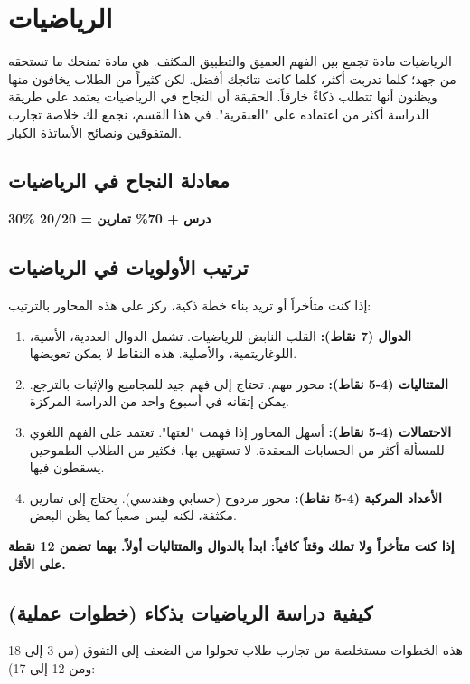 \documentclass[12pt,a4paper]{book}
\newcommand{\importantAr}[1]{%
	\begin{important}
		\bfseries #1
	\end{important}
}
\begin{document}
	\section{الرياضيات}
	
	الرياضيات مادة تجمع بين الفهم العميق والتطبيق المكثف. هي مادة تمنحك ما تستحقه من جهد؛ كلما تدربت أكثر، كلما كانت نتائجك أفضل. لكن كثيراً من الطلاب يخافون منها ويظنون أنها تتطلب ذكاءً خارقاً. الحقيقة أن النجاح في الرياضيات يعتمد على طريقة الدراسة أكثر من اعتماده على "العبقرية". في هذا القسم، نجمع لك خلاصة تجارب المتفوقين ونصائح الأساتذة الكبار.
	
	\subsection{معادلة النجاح في الرياضيات}
	\begin{center}
		\Large
		\textbf{30\% درس + 70\% تمارين = 20/20}
	\end{center}
	
	\subsection{ترتيب الأولويات في الرياضيات}
	إذا كنت متأخراً أو تريد بناء خطة ذكية، ركز على هذه المحاور بالترتيب:
	
	\begin{enumerate}
		\item \textbf{الدوال (7 نقاط):} القلب النابض للرياضيات. تشمل الدوال العددية، الأسية، اللوغاريتمية، والأصلية. هذه النقاط لا يمكن تعويضها.
		\item \textbf{المتتاليات (4-5 نقاط):} محور مهم. تحتاج إلى فهم جيد للمجاميع والإثبات بالترجع. يمكن إتقانه في أسبوع واحد من الدراسة المركزة.
		\item \textbf{الاحتمالات (4-5 نقاط):} أسهل المحاور إذا فهمت "لغتها". تعتمد على الفهم اللغوي للمسألة أكثر من الحسابات المعقدة. لا تستهين بها، فكثير من الطلاب الطموحين يسقطون فيها.
		\item \textbf{الأعداد المركبة (4-5 نقاط):} محور مزدوج (حسابي وهندسي). يحتاج إلى تمارين مكثفة، لكنه ليس صعباً كما يظن البعض.
	\end{enumerate}
	
	\importantAr{إذا كنت متأخراً ولا تملك وقتاً كافياً: ابدأ بالدوال والمتتاليات أولاً. بهما تضمن 12 نقطة على الأقل.}
	
	\subsection{كيفية دراسة الرياضيات بذكاء (خطوات عملية)}
	هذه الخطوات مستخلصة من تجارب طلاب تحولوا من الضعف إلى التفوق (من 3 إلى 18 ومن 12 إلى 17):
	
\end{document}
